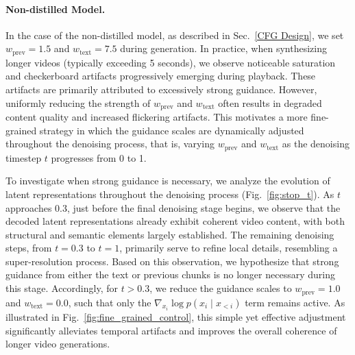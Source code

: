 \paragraph{Non-distilled Model.}
In the case of the non-distilled model, as described in Sec.~\ref{CFG Design}, we set \( w_{\text{prev}} = 1.5 \) and \( w_{\text{text}} = 7.5 \) during generation. In practice, when synthesizing longer videos (typically exceeding 5 seconds), we observe noticeable saturation and checkerboard artifacts progressively emerging during playback. These artifacts are primarily attributed to excessively strong guidance. However, uniformly reducing the strength of \(w_{\text{prev}}\) and \(w_{\text{text}}\) often results in degraded content quality and increased flickering artifacts. This motivates a more fine-grained strategy in which the guidance scales are dynamically adjusted throughout the denoising process, that is, varying \( w_{\text{prev}} \) and \( w_{\text{text}} \) as the denoising timestep \( t \) progresses from 0 to 1.

To investigate when strong guidance is necessary, we analyze the evolution of latent representations throughout the denoising process (Fig.~\ref{fig:stop_t}). As \( t \) approaches 0.3, just before the final denoising stage begins, we observe that the decoded latent representations already exhibit coherent video content, with both structural and semantic elements largely established. The remaining denoising steps, from \( t = 0.3 \) to \( t = 1 \), primarily serve to refine local details, resembling a super-resolution process. Based on this observation, we hypothesize that strong guidance from either the text or previous chunks is no longer necessary during this stage. Accordingly, for \( t > 0.3 \), we reduce the guidance scales to \( w_{\text{prev}} = 1.0 \) and \( w_{\text{text}} = 0.0 \), such that only the \( \nabla_{x_i} \log p(x_i \mid x_{<i}) \) term remains active. As illustrated in Fig.~\ref{fig:fine_grained_control}, this simple yet effective adjustment significantly alleviates temporal artifacts and improves the overall coherence of longer video generations.

